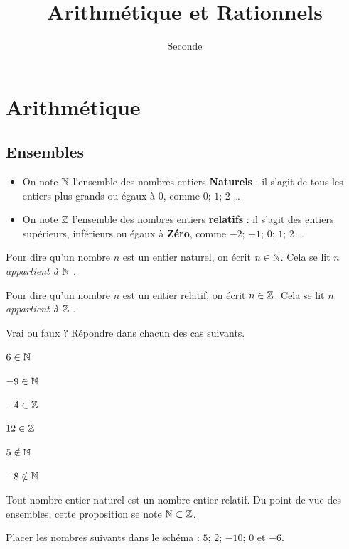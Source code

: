 \documentclass{poly}
\title{Arithmétique et Rationnels}
\date{}
\author{Seconde}
\begin{document}
\maketitle

\section{Arithmétique}
\subsection{Ensembles}
\begin{definition}
\hfill
\begin{itemize}
\item On note $\mathbb{N}$ l'ensemble des nombres entiers \textbf{Naturels} : il s'agit de tous les entiers plus grands ou égaux à $0$, comme $0$; $1$; $2$ \dots
\item On note $\mathbb{Z}$ l'ensemble des nombres entiers \textbf{relatifs} : il s'agit des entiers supérieurs, inférieurs ou égaux à \textbf{Zéro}, comme $-2$; $-1$; $0$; $1$; $2$ \dots
\end{itemize}
\end{definition}
\begin{definition}
\hfill

Pour dire qu'un nombre $n$ est un entier naturel, on écrit $n \in \mathbb{N}$. Cela se lit \emph{\og $n$ appartient à $\mathbb{N}$ \fg}.

Pour dire qu'un nombre $n$ est un entier relatif, on écrit $n \in \mathbb{Z}$. Cela se lit \emph{\og $n$ appartient à $\mathbb{Z}$ \fg}.
\end{definition}
\begin{example}
Vrai ou faux ? Répondre dans chacun des cas suivants.
\begin{alphaquestions}
\begin{minipage}{0.45\textwidth}
\item $6 \in \mathbb{N}$ 
\item $-9 \in \mathbb{N}$ 
\item $-4 \in \mathbb{Z}$ 
\end{minipage}
\hfill
\begin{minipage}{0.45\textwidth}
\item $12 \in \mathbb{Z}$         
\item $5 \notin \mathbb{N}$ 
\item $-8 \notin \mathbb{N}$ 
\end{minipage}
\end{alphaquestions}
\end{example}
\begin{proposition}
Tout nombre entier naturel est un nombre entier relatif. Du point de vue des ensembles, cette proposition se note $\mathbb{N} \subset \mathbb{Z}$.
\end{proposition}
\begin{example}
Placer les nombres suivants dans le schéma : $5$; $2$; $-10$; $0$ et $-6$.
\begin{center}
\end{center}
\end{example}
\newpage
\end{document}
